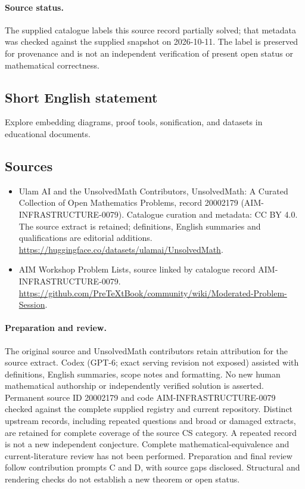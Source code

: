 \documentclass[11pt]{article}
\begin{document}
\paragraph{Source status.}
The supplied catalogue labels this source record partially solved; that metadata was checked against the supplied snapshot on 2026-10-11. The label is preserved for provenance and is not an independent verification of present open status or mathematical correctness.
\subsection{Short English statement}
Explore embedding diagrams, proof tools, sonification, and datasets in educational documents.
\subsection{Sources}
\begin{itemize}
\item[\hypertarget{source:20002179:1}{S1}] Ulam AI and the UnsolvedMath Contributors, UnsolvedMath: A Curated Collection of Open Mathematics Problems, record 20002179 (AIM-INFRASTRUCTURE-0079). Catalogue curation and metadata: CC BY 4.0. The source extract is retained; definitions, English summaries and qualifications are editorial additions.
\url{https://huggingface.co/datasets/ulamai/UnsolvedMath}.
\item[\hypertarget{source:20002179:2}{S2}] AIM Workshop Problem Lists, source linked by catalogue record AIM-INFRASTRUCTURE-0079.
\url{https://github.com/PreTeXtBook/community/wiki/Moderated-Problem-Session}.
\end{itemize}
\paragraph{Preparation and review.}
The original source and UnsolvedMath contributors retain attribution for the source extract. Codex (GPT-6; exact serving revision not exposed) assisted with definitions, English summaries, scope notes and formatting. No new human mathematical authorship or independently verified solution is asserted. Permanent source ID 20002179 and code AIM-INFRASTRUCTURE-0079 checked against the complete supplied registry and current repository. Distinct upstream records, including repeated questions and broad or damaged extracts, are retained for complete coverage of the source CS category. A repeated record is not a new independent conjecture. Complete mathematical-equivalence and current-literature review has not been performed. Preparation and final review follow contribution prompts C and D, with source gaps disclosed. Structural and rendering checks do not establish a new theorem or open status.
\label{end:20002179}
\end{document}
